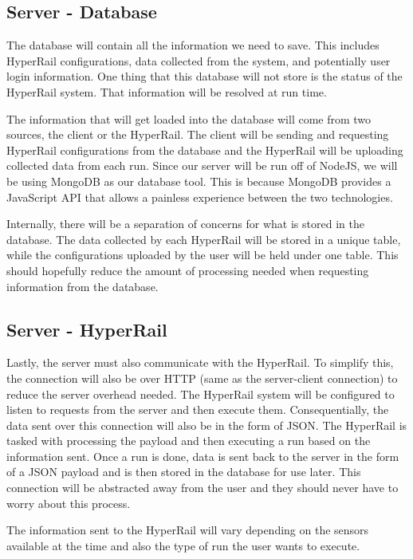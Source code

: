 \documentclass[onecolumn, draftclsnofoot,10pt, compsoc]{IEEEtran}
\begin{document}
    \subsection{Server - Database}
    
        The database will contain all the information we need to save. This includes HyperRail configurations, data collected from the system, and potentially user login information. One thing that this database will not store is the status of the HyperRail system. That information will be resolved at run time. 
        
        The information that will get loaded into the database will come from two sources, the client or the HyperRail. The client will be sending and requesting HyperRail configurations from the database and the HyperRail will be uploading collected data from each run. Since our server will be run off of NodeJS, we will be using MongoDB as our database tool. This is because MongoDB provides a JavaScript API that allows a painless experience between the two technologies. 
        
        Internally, there will be a separation of concerns for what is stored in the database. The data collected by each HyperRail will be stored in a unique table, while the configurations uploaded by the user will be held under one table. This should hopefully reduce the amount of processing needed when requesting information from the database.
    
    \subsection{Server - HyperRail}
    
        Lastly, the server must also communicate with the HyperRail. To simplify this, the connection will also be over HTTP (same as the server-client connection) to reduce the server overhead needed. The HyperRail system will be configured to listen to requests from the server and then execute them. Consequentially, the data sent over this connection will also be in the form of JSON. The HyperRail is tasked with processing the payload and then executing a run based on the information sent. Once a run is done, data is sent back to the server in the form of a JSON payload and is then stored in the database for use later. This connection will be abstracted away from the user and they should never have to worry about this process.
        
        The information sent to the HyperRail will vary depending on the sensors available at the time and also the type of run the user wants to execute. 
        
\end{document}
